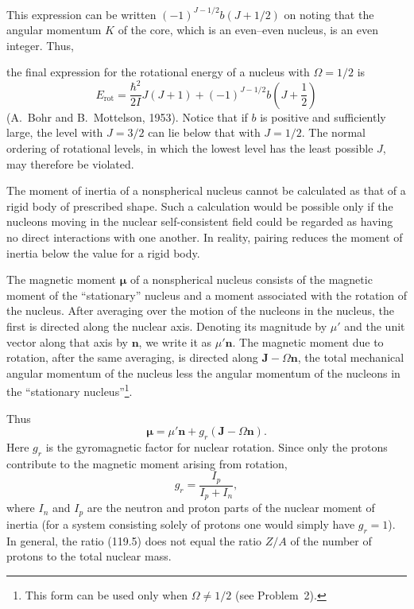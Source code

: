 This expression can be written $(-1)^{J-1/2}b(J+1/2)$ on noting that the
angular momentum $K$ of the core, which is an even--even nucleus, is an even
integer. Thus,

the final expression for the rotational energy of a nucleus with
$\Omega=1/2$ is
\begin{equation}
 E_{\mathrm{rot}}=\frac{\hbar^2}{2I}J(J+1)
 +(-1)^{J-1/2}b\left(J+\frac12\right)
 \tag{119.3}
\end{equation}
(A.~Bohr and B.~Mottelson, 1953). Notice that if $b$ is positive and
sufficiently large, the level with $J=3/2$ can lie below that with $J=1/2$.
The normal ordering of rotational levels, in which the lowest level has the
least possible $J$, may therefore be violated.

The moment of inertia of a nonspherical nucleus cannot be calculated as that
of a rigid body of prescribed shape. Such a calculation would be possible only
if the nucleons moving in the nuclear self-consistent field could be regarded
as having no direct interactions with one another. In reality, pairing reduces
the moment of inertia below the value for a rigid body.

The magnetic moment $\boldsymbol\mu$ of a nonspherical nucleus consists of the
magnetic moment of the ``stationary'' nucleus and a moment associated with the
rotation of the nucleus. After averaging over the motion of the nucleons in
the nucleus, the first is directed along the nuclear axis. Denoting its
magnitude by $\mu'$ and the unit vector along that axis by $\mathbf n$, we
write it as $\mu'\mathbf n$. The magnetic moment due to rotation, after the
same averaging, is directed along $\mathbf J-\Omega\mathbf n$, the total
mechanical angular momentum of the nucleus less the angular momentum of the
nucleons in the ``stationary nucleus''\footnote{This form can be used only
when $\Omega\ne1/2$ (see Problem~2).}.

Thus
\begin{equation}
 \boldsymbol\mu=\mu'\mathbf n+g_r(\mathbf J-\Omega\mathbf n).
 \tag{119.4}
\end{equation}
Here $g_r$ is the gyromagnetic factor for nuclear rotation. Since only the
protons contribute to the magnetic moment arising from rotation,
\begin{equation}
 g_r=\frac{I_p}{I_p+I_n},
 \tag{119.5}
\end{equation}
where $I_n$ and $I_p$ are the neutron and proton parts of the nuclear moment
of inertia (for a system consisting solely of protons one would simply have
$g_r=1$). In general, the ratio (119.5) does not equal the ratio $Z/A$ of the
number of protons to the total nuclear mass.

